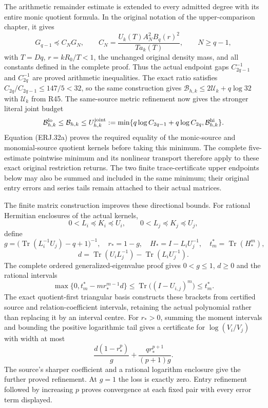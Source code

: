 The arithmetic remainder estimate is extended to every admitted
degree with its entire monic quotient formula. In the original
notation of the upper-comparison chapter, it gives
\[
 G_{q-1}\preceq C_NG_N,\qquad
 C_N=\frac{U_k(T)A_N^2B_q(r)^2}{T a_k(T)},\qquad
 N\ge q-1,
\]
with $T=Dq$, $r=kR_0/T<1$, the unchanged original density mass,
and all constants defined in the complete proof. Thus the actual
endpoint gaps $C_{2q-1}^{-1}$ and $C_{2q}^{-1}$ are proved
arithmetic inequalities. The exact ratio satisfies
$C_{2q}/C_{2q-1}\le147/5<32$, so the same construction gives
$\mathcal B_{h,k}\le2\mathcal U_k+q\log32$ with
$\mathcal U_k$ from R45.
The same-source metric refinement now gives the stronger literal
joint budget
\[
 \mathcal B_{h,k}^{\rm lo}\le\mathcal B_{h,k}\le
 U_{h,k}^{\rm joint}:=
 \min\{q\log C_{2q-1}+q\log C_{2q},\mathcal B_{h,k}^{\rm hi}\}.
\]
Equation (ERJ.32a) proves the required equality of the monic-source
and monomial-source quotient kernels before taking this minimum.
The complete five-estimate pointwise minimum and its nonlinear transport
therefore apply to these exact original restriction returns.
The two finite trace-certificate upper endpoints below may also be
summed and included in the same minimum; their original entry errors
and series tails remain attached to their actual matrices.

The finite matrix construction improves these directional bounds.
For rational Hermitian enclosures of the actual kernels,
\[
 0<L_i\preceq K_i\preceq U_i,\qquad
 0<L_j\preceq K_j\preceq U_j,
\]
define
\[
 g=\bigl(\operatorname{Tr}(L_i^{-1}U_j)-q+1\bigr)^{-1},
 \quad r_*=1-g,\quad
 H_*=I-L_iU_j^{-1},\quad t_m^*=\operatorname{Tr}(H_*^m),
\]
\[
 d=\operatorname{Tr}(U_iL_j^{-1})
     -\operatorname{Tr}(L_iU_j^{-1}).
\]
The complete ordered generalized-eigenvalue proof gives
$0<g\le1$, $d\ge0$ and the rational intervals
\[
 \max\{0,t_m^*-m r_*^{m-1}d\}
 \le\operatorname{Tr}\bigl((I-U_{i,j})^m\bigr)\le t_m^*.
\]
The exact quotient-first triangular basis constructs these brackets
from certified source and relation-coefficient intervals, retaining
the actual polynomial rather than replacing it by an interval centre.
For $r_*>0$, summing the moment intervals and bounding the positive
logarithmic tail gives a certificate for $\log(V_i/V_j)$ with width
at most
\[
 \frac{d(1-r_*^p)}g+
 \frac{q r_*^{p+1}}{(p+1)g}.
\]
The source's sharper coefficient and a rational logarithm enclosure
give the further proved refinement. At $g=1$ the loss is exactly
zero. Entry refinement followed by increasing $p$ proves convergence
at each fixed pair with every error term displayed.

